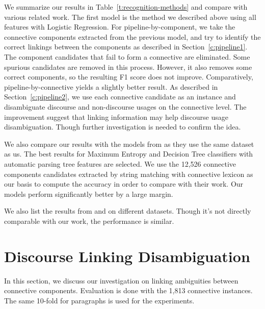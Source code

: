 

We summarize our results in Table~\ref{t:recognition-methods} and
compare with various related work. The first model is the method we described above
using all features with Logistic Regression. For pipeline-by-component,
we take the connective components extracted from the previous model, and try to
identify the correct linkings between the components as described in Section~\ref{c:pipeline1}.
The component candidates that fail to form a connective are eliminated.
Some spurious candidates are removed in this process. However, it also removes some
correct components, so the resulting F1 score does not improve. Comparatively,
pipeline-by-connective yields a slightly better result. As described in
Section~\ref{c:pipeline2}, we use each connective candidate as an instance and
disambiguate discourse and non-discourse usages on the connective level.
The improvement suggest that linking information may help discourse usage disambiguation.
Though further investigation is needed to confirm the idea.

We also compare our results with the models from \cite{li2015automatic} as they use the
same dataset as us. The best results for Maximum Entropy and Decision Tree classifiers with
automatic parsing tree features are selected. We use the 12,526 connective components candidates
extracted by string matching with connective lexicon as our basis to compute the accuracy in order
to compare with their work. Our models perform significantly better by a large margin.

We also list the results from \cite{zhou2012cross} and \cite{li2014cross} on different
datasets. Though it's not directly comparable with our work, the performance is similar.



\section{Discourse Linking Disambiguation}
\label{c:linking-exp}

In this section, we discuss our investigation on linking ambiguities between connective components. Evaluation is done with the 1,813 connective instances. The same 10-fold
for paragraphs is used for the experiments.

